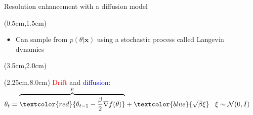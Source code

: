 \documentclass{beamer}					%
\begin{document}
\begin{frame}{Resolution enhancement with a diffusion model}
\begin{textblock*}{13cm}(0.5cm,1.5cm)
\begin{itemize}
\item Can sample from $p(\theta\lvert \boldsymbol{x})$ using a stochastic process called Langevin dynamics
\end{itemize}
\end{textblock*}
\begin{textblock*}{8cm}(3.5cm,2.0cm)
\end{textblock*}
\begin{textblock*}{14cm}(2.25cm,8.0cm)
\textcolor{red}{Drift} and \textcolor{blue}{diffusion}: 
$\theta_{t} = 
\overset{\mu}{\overbrace{\textcolor{red}{\theta_{t-1} - \frac{\beta}{2}\nabla f(\theta)}}} 
+ \textcolor{blue}{\sqrt{\beta}\xi} 
\;\;\; \xi \sim \mathcal{N}(0,I)$
\end{textblock*}
\end{frame}

\end{document}
